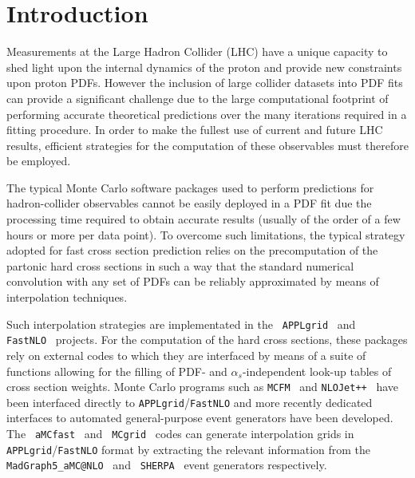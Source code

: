 \documentclass[preprint,12pt]{elsarticle}
\begin{document}
\clearpage


\section{Introduction}\label{sec:intro}

Measurements at the Large Hadron Collider (LHC) have a unique capacity to shed light upon the internal dynamics 
of the proton and provide new constraints upon proton PDFs. However the inclusion of large collider datasets 
into PDF fits can provide a significant challenge due to the large computational footprint of performing accurate
theoretical predictions over the many iterations required in a fitting procedure. In order to make the fullest use of current 
and future LHC results, efficient strategies for the computation of these observables must therefore be employed. 

The typical Monte Carlo software packages used to perform predictions for 
hadron-collider observables cannot be easily deployed in a PDF fit due the processing time 
required to obtain accurate results (usually of the order of a few hours or more per data
point). To overcome such limitations, the typical strategy
adopted for fast cross section prediction relies on the precomputation
of the partonic hard cross sections in such a way that the standard numerical
convolution with any set of PDFs can be reliably approximated by means of
interpolation techniques.

Such interpolation strategies are implementated in the {\tt
  APPLgrid}~\cite{Carli:2010rw} and {\tt
  FastNLO}~\cite{Wobisch:2011ij} projects. For the computation of the
hard cross sections, these packages rely on external codes to which
they are interfaced by means of a suite of functions allowing for the
filling of PDF- and $\alpha_s$-independent look-up tables of
cross section weights. Monte Carlo programs such as {\tt MCFM}~\cite{Campbell:2010ff}
and {\tt NLOJet++}~\cite{Nagy:2003tz} have been interfaced directly to
{\tt APPLgrid}/{\tt FastNLO} and more recently de\-di\-ca\-ted
interfaces to automated general-purpose event
generators have been developed. The {\tt
  aMCfast}~\cite{Bertone:2014zva} and {\tt
  MCgrid}~\cite{DelDebbio:2013kxa} codes can generate interpolation grids in {\tt APPLgrid}/{\tt FastNLO} format 
 by extracting the relevant information from the {\tt
  MadGraph5\_aMC@NLO}~\cite{Alwall:2014hca} and {\tt
  SHERPA}~\cite{Gleisberg:2008ta} event generators respectively.
\end{document}
